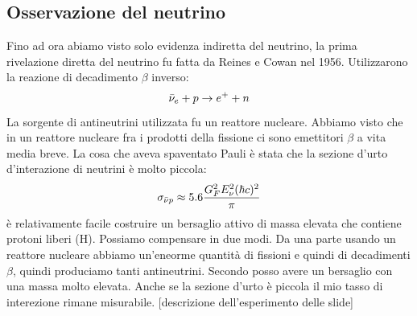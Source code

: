 \subsection{Osservazione del neutrino}
Fino ad ora abiamo visto solo evidenza indiretta del neutrino, la prima rivelazione diretta del neutrino fu fatta da Reines e Cowan nel 1956. Utilizzarono la reazione di decadimento $\beta$ inverso:
\begin{equation*}
    \Bar{\nu}_e+p\to e^++n
\end{equation*}
La sorgente di antineutrini utilizzata fu un reattore nucleare. Abbiamo visto che in un reattore nucleare fra i prodotti della fissione ci sono emettitori $\beta$ a vita media breve. La cosa che aveva spaventato Pauli è stata che la sezione d'urto d'interazione di neutrini è molto piccola:
\begin{equation*}
    \sigma_{\Bar{\nu}p}\approx 5.6\frac{G_F^2E_\nu^2(\hbar c)^2}{\pi}
\end{equation*}
è relativamente facile costruire un bersaglio attivo di massa elevata che contiene protoni liberi (H). Possiamo compensare in due modi. Da una parte usando un reattore nucleare abbiamo un'eneorme quantità di fissioni e quindi di decadimenti $\beta$, quindi produciamo tanti antineutrini. Secondo posso avere un bersaglio con una massa molto elevata. Anche se la sezione d'urto è piccola il mio tasso di interezione rimane misurabile. [descrizione dell'esperimento delle slide]
